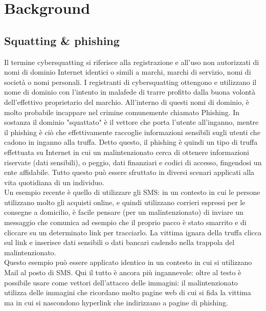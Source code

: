 \chapter{Background}

\section{Squatting \& phishing}
Il termine cybersquatting\cite{dewani2022handbook} si riferisce alla registrazione e all'uso non autorizzati di nomi di dominio Internet identici o simili a marchi, marchi di servizio, nomi di società o nomi personali. I registranti di cybersquatting ottengono e utilizzano il nome di dominio con l'intento in malafede di trarre profitto dalla buona volontà dell'effettivo proprietario del marchio. All'interno di questi nomi di dominio, è molto probabile incappare nel crimine comunemente chiamato Phishing. In sostanza il dominio "squattato" è il vettore che porta l'utente all'inganno, mentre il phishing è ciò che effettivamente raccoglie informazioni sensibili sugli utenti che cadono in inganno alla truffa.
Detto questo, il phishing è quindi un tipo di truffa effettuata su Internet in cui un malintenzionato cerca di ottenere informazioni riservate (dati sensibili), o peggio, dati finanziari e codici di accesso, fingendosi un ente affidabile. Tutto questo può essere sfruttato in diversi scenari applicati alla vita quotidiana di un individuo.\\
Un esempio recente è quello di utilizzare gli SMS: in un contesto in cui le persone utilizzano molto gli acquisti online, e quindi utilizzano corrieri espressi per le consegne a domicilio, è facile pensare (per un malintenzionato) di inviare un messaggio che comunica ad esempio che il proprio pacco è stato smarrito e di cliccare su un determinato link per tracciarlo. La vittima ignara della truffa clicca sul link e inserisce dati sensibili o dati bancari cadendo nella trappola del malintenzionato.\\
Questo esempio può essere applicato identico in un contesto in cui si utilizzano Mail al posto di SMS. Qui il tutto è ancora più ingannevole: oltre al testo è possibile usare come vettori dell'attacco delle immagini: il malintenzionato utilizza delle immagini che ricordano molto pagine web di cui si fida la vittima ma in cui si nascondono hyperlink che indirizzano a pagine di phishing.
